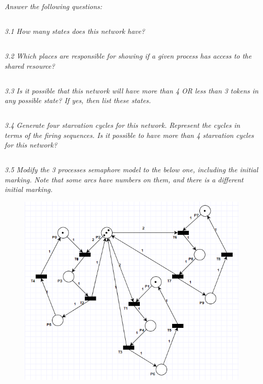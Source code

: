 \documentclass[letterpaper]{article}
\begin{document}
\textit{Answer the following questions:}

\subsection{}
\textit{3.1  How many states does this network have?
}

\subsection{}
\textit{3.2  Which places are responsible for showing if a given process has access to the shared resource?}

\subsection{}
\textit{3.3  Is it possible that this network will have more than 4 OR less than 3 tokens in any possible state?
 If yes, then list these states.
}

\subsection{}
\textit{3.4  Generate four starvation cycles for this network. Represent the cycles in terms of the firing sequences. Is it possible to have more than 4 starvation cycles for this network?}

\subsection{}
\textit{ 3.5  Modify the 3 processes semaphore model to the below one, including the initial marking.
 Note that some arcs have numbers on them, and there is a different initial marking.
}

\begin{figure}[H]
 \centering
 \includegraphics[width=\textwidth]{image5.png}
\end{figure}
\end{document}

